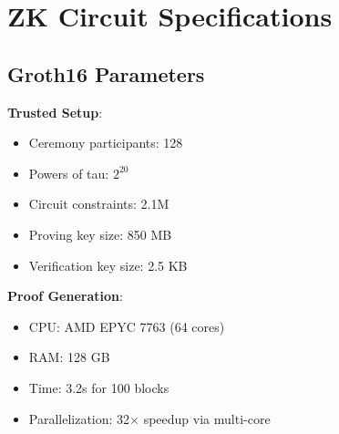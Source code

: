 \section{ZK Circuit Specifications}


\subsection{Groth16 Parameters}

\textbf{Trusted Setup}:
\begin{itemize}[leftmargin=1.1em]
  \item Ceremony participants: 128
  \item Powers of tau: $2^{20}$
  \item Circuit constraints: 2.1M
  \item Proving key size: 850 MB
  \item Verification key size: 2.5 KB
\end{itemize}

\textbf{Proof Generation}:
\begin{itemize}[leftmargin=1.1em]
  \item CPU: AMD EPYC 7763 (64 cores)
  \item RAM: 128 GB
  \item Time: 3.2s for 100 blocks
  \item Parallelization: 32$\times$ speedup via multi-core
\end{itemize}

